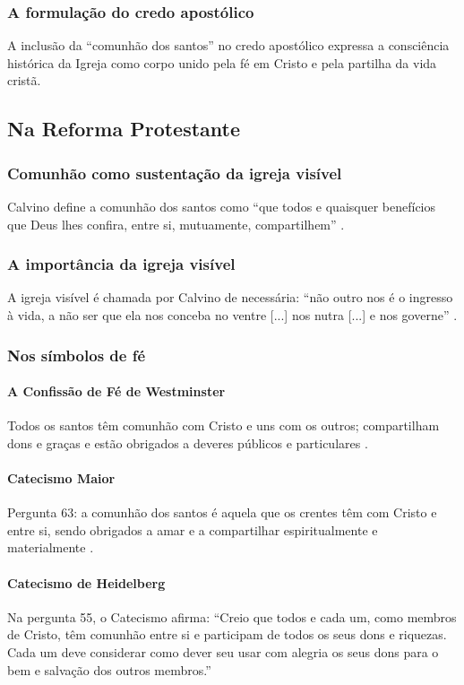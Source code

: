 \subsubsection{A formulação do credo apostólico}
A inclusão da ``comunhão dos santos'' no credo apostólico expressa a consciência histórica da Igreja como corpo unido pela fé em Cristo e pela partilha da vida cristã.

\subsection{Na Reforma Protestante}

\subsubsection{Comunhão como sustentação da igreja visível}
Calvino define a comunhão dos santos como ``que todos e quaisquer benefícios que Deus lhes confira, entre si, mutuamente, compartilhem'' \cite{calvino2022}.

\subsubsection{A importância da igreja visível}
A igreja visível é chamada por Calvino de necessária: ``não outro nos é o ingresso à vida, a não ser que ela nos conceba no ventre [...] nos nutra [...] e nos governe'' \cite{calvino2022}.

\subsubsection{Nos símbolos de fé}

\paragraph{A Confissão de Fé de Westminster} 
Todos os santos têm comunhão com Cristo e uns com os outros; compartilham dons e graças e estão obrigados a deveres públicos e particulares \cite{cfw}.

\paragraph{Catecismo Maior} 
Pergunta 63: a comunhão dos santos é aquela que os crentes têm com Cristo e entre si, sendo obrigados a amar e a compartilhar espiritualmente e materialmente \cite{catecismoMaior}.

\paragraph{Catecismo de Heidelberg} 
Na pergunta 55, o Catecismo afirma: ``Creio que todos e cada um, como membros de Cristo, têm comunhão entre si e participam de todos os seus dons e riquezas. Cada um deve considerar como dever seu usar com alegria os seus dons para o bem e salvação dos outros membros.'' \cite{heidelberg}

